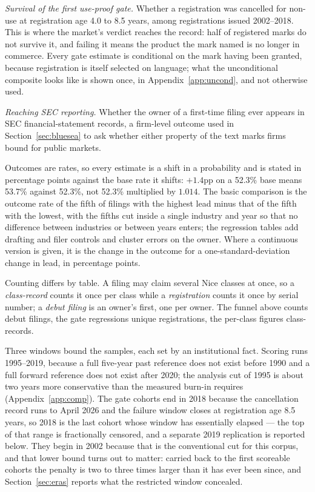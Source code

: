 \documentclass[11pt]{article}
\begin{document}
\emph{Survival of the first use-proof gate.} Whether a registration was
cancelled for non-use at registration age 4.0 to 8.5 years, among
registrations issued 2002--2018. This is where the market's verdict reaches
the record: half of registered marks do not survive it, and failing it means
the product the mark named is no longer in commerce. Every gate estimate is
conditional on the mark having been granted, because registration is itself
selected on language; what the unconditional composite looks like is shown
once, in Appendix~\ref{app:uncond}, and not otherwise used.

\emph{Reaching SEC reporting.} Whether the owner of a first-time filing ever
appears in SEC financial-statement records, a firm-level outcome used in
Section~\ref{sec:bluesea} to ask whether either property of the text marks
firms bound for public markets.

Outcomes are rates, so every estimate is a shift in a probability and is
stated in percentage points against the base rate it shifts: $+1.4$pp on a
52.3\% base means 53.7\% against 52.3\%, not 52.3\% multiplied by $1.014$.
The basic comparison is the outcome rate of the fifth of filings with the
highest lead minus that of the fifth with the lowest, with the fifths cut
inside a single industry and year so that no difference between industries or
between years enters; the regression tables add drafting and filer controls
and cluster errors on the owner. Where a continuous version is given, it is
the change in the outcome for a one-standard-deviation change in lead, in
percentage points.

Counting differs by table. A filing may claim several Nice classes at once, so
a \emph{class-record} counts it once per class while a \emph{registration}
counts it once by serial number; a \emph{debut filing} is an owner's first, one
per owner. The funnel above counts debut filings, the gate regressions unique
registrations, the per-class figures class-records.

Three windows bound the samples, each set by an institutional fact. Scoring
runs 1995--2019, because a full
five-year past reference does not exist before 1990 and a full forward
reference does not exist after 2020; the analysis cut of 1995 is about two
years more conservative than the measured burn-in requires
(Appendix~\ref{app:comp}). The gate cohorts end in 2018 because the
cancellation record runs to April 2026 and the failure window closes at
registration age 8.5 years, so 2018 is the last cohort whose window has
essentially elapsed --- the top of that range is fractionally censored, and
a separate 2019 replication is reported below. They begin in 2002 because
that is the conventional cut for this corpus, and that lower
bound turns out to matter: carried back to the first scoreable cohorts the
penalty is two to three times larger than it has ever been since, and
Section~\ref{sec:eras} reports what the restricted window concealed.
\end{document}

